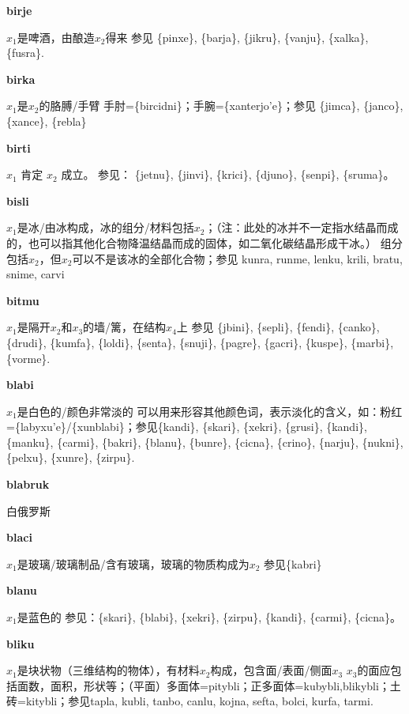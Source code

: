 \documentclass[notitlepage,twocolumn,a4paper,10pt]{book}
\begin{document}
{\sffamily\bfseries birje} $x_1$是啤酒，由酿造$x_2$得来 \textemdash{} 参见 \{pinxe\}, \{barja\}, \{jikru\}, \{vanju\}, \{xalka\}, \{fusra\}.

{\sffamily\bfseries birka}\enspace {\ttfamily\bfseries[bir]}  $x_1$是$x_2$的胳膊\slash{}手臂 \textemdash{} 手肘=\{bircidni\}；手腕=\{xanterjo'e\}；参见 \{jimca\}, \{janco\}, \{xance\}, \{rebla\}

{\sffamily\bfseries birti}\enspace {\ttfamily\bfseries[bit]}  $x_{1}$ 肯定 $x_{2}$ 成立。 \textemdash{} 参见： \{jetnu\}, \{jinvi\}, \{krici\}, \{djuno\}, \{senpi\}, \{sruma\}。

{\sffamily\bfseries bisli}\enspace {\ttfamily\bfseries[bis]}  $x_1$是冰\slash{}由冰构成，冰的组分\slash{}材料包括$x_2$；（注：此处的冰并不一定指水结晶而成的，也可以指其他化合物降温结晶而成的固体，如二氧化碳结晶形成干冰。） \textemdash{} 组分包括$x_2$，但$x_2$可以不是该冰的全部化合物；参见 {kunra}, {runme}, {lenku}, {krili}, {bratu}, {snime}, {carvi}

{\sffamily\bfseries bitmu}\enspace {\ttfamily\bfseries[bim     bi'u]}  $x_1$是隔开$x_2$和$x_3$的墙\slash{}篱，在结构$x_4$上 \textemdash{} 参见 \{jbini\}, \{sepli\}, \{fendi\}, \{canko\}, \{drudi\}, \{kumfa\}, \{loldi\}, \{senta\}, \{snuji\}, \{pagre\}, \{gacri\}, \{kuspe\}, \{marbi\}, \{vorme\}.

{\sffamily\bfseries blabi}\enspace {\ttfamily\bfseries[lab]}  $x_1$是白色的\slash{}颜色非常淡的 \textemdash{} 可以用来形容其他颜色词，表示淡化的含义，如：粉红=\{labyxu'e\}\slash{}\{xunblabi\}；参见\{kandi\}, \{skari\}, \{xekri\}, \{grusi\}, \{kandi\}, \{manku\}, \{carmi\}, \{bakri\}, \{blanu\}, \{bunre\}, \{cicna\}, \{crino\}, \{narju\}, \{nukni\}, \{pelxu\}, \{xunre\}, \{zirpu\}.

{\sffamily\bfseries blabruk} 白俄罗斯

{\sffamily\bfseries blaci} $x_1$是玻璃\slash{}玻璃制品\slash{}含有玻璃，玻璃的物质构成为$x_2$ \textemdash{} 参见\{kabri\}

{\sffamily\bfseries blanu}\enspace {\ttfamily\bfseries[    bla]}  $x_1$是蓝色的 \textemdash{} 参见：\{skari\}, \{blabi\}, \{xekri\}, \{zirpu\}, \{kandi\}, \{carmi\}, \{cicna\}。

{\sffamily\bfseries bliku}\enspace {\ttfamily\bfseries[    bli]}  $x_1$是块状物（三维结构的物体），有材料$x_2$构成，包含面\slash{}表面\slash{}侧面$x_3$ \textemdash{} $x_3$的面应包括面数，面积，形状等；（平面）多面体={pitybli}；正多面体={kubybli},{blikybli}；土砖={kitybli}；参见{tapla}, {kubli}, {tanbo}, {canlu}, {kojna}, {sefta}, {bolci}, {kurfa}, {tarmi}.
\end{document}

